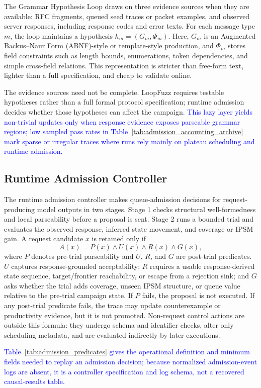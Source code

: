 \documentclass[final,5p,times,number]{elsarticle}
\begin{document}
The Grammar Hypothesis Loop draws on three evidence sources when they are available: RFC fragments, queued seed traces or packet examples, and observed server responses, including response codes and error texts. For each message type $m$, the loop maintains a hypothesis $h_m=(G_m,\Phi_m)$. Here, $G_m$ is an Augmented Backus--Naur Form (ABNF)-style or template-style production, and $\Phi_m$ stores field constraints such as length bounds, enumerations, token dependencies, and simple cross-field relations. This representation is stricter than free-form text, lighter than a full specification, and cheap to validate online.

The evidence sources need not be complete. LoopFuzz requires testable hypotheses rather than a full formal protocol specification; runtime admission decides whether those hypotheses can affect the campaign. \textcolor{blue}{This lazy layer yields non-trivial updates only when response evidence exposes parseable grammar regions; low sampled pass rates in Table~\ref{tab:admission_accounting_archive} mark sparse or irregular traces where runs rely mainly on plateau scheduling and runtime admission.}

\subsection{Runtime Admission Controller}
The runtime admission controller makes queue-admission decisions for request-producing model outputs in two stages. Stage 1 checks structural well-formedness and local parseability before a proposal is sent. Stage 2 runs a bounded trial and evaluates the observed response, inferred state movement, and coverage or IPSM gain. A request candidate $x$ is retained only if
\[
A(x)=P(x) \land U(x) \land R(x) \land G(x),
\]
where $P$ denotes pre-trial parseability and $U$, $R$, and $G$ are post-trial predicates. $U$ captures response-grounded acceptability; $R$ requires a usable response-derived state sequence, target/frontier reachability, or escape from a rejection sink; and $G$ asks whether the trial adds coverage, unseen IPSM structure, or queue value relative to the pre-trial campaign state. If $P$ fails, the proposal is not executed. If any post-trial predicate fails, the trace may update counterexample or productivity evidence, but it is not promoted. Non-request control actions are outside this formula: they undergo schema and identifier checks, alter only scheduling metadata, and are evaluated indirectly by later executions.

\textcolor{blue}{Table~\ref{tab:admission_predicates} gives the operational definition and minimum fields needed to replay an admission decision; because normalized admission-event logs are absent, it is a controller specification and log schema, not a recovered causal-results table.}
\end{document}

